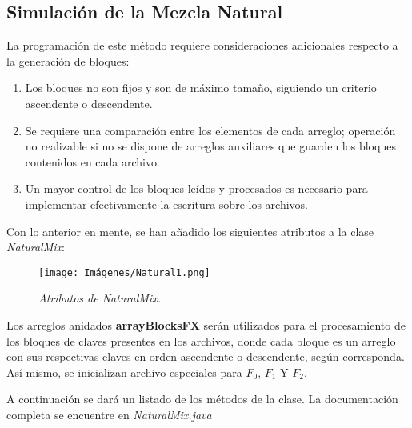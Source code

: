\documentclass[letterpaper,12pt]{extarticle}
\begin{document}
\pagebreak

\subsection{Simulación de la Mezcla Natural}

\noindent La programación de este método requiere consideraciones adicionales respecto a la generación de bloques:

\begin{enumerate}
\item Los bloques no son fijos y son de máximo tamaño, siguiendo un criterio ascendente o descendente.
\item Se requiere una comparación entre los elementos de cada arreglo; operación no realizable si no se dispone
de arreglos auxiliares que guarden los bloques contenidos en cada archivo.
\item Un mayor control de los bloques leídos y procesados es necesario para implementar efectivamente la escritura sobre los archivos.
\end{enumerate}

Con lo anterior en mente, se han añadido los siguientes atributos a la clase \textit{NaturalMix}:

\begin{figure}[h!]
    \centering
    \texttt{[image: Imágenes/Natural1.png]}
    \caption{\textit{Atributos de NaturalMix.}}
    \label{fig:Natural1}
    \end{figure} 
    
Los arreglos anidados \textbf{arrayBlocksFX} serán utilizados para el procesamiento de los bloques de claves presentes en los archivos, donde cada bloque es un arreglo con sus respectivas claves en orden ascendente o descendente, según corresponda. Así mismo, se inicializan archivo especiales para $F_{0}$, $F_{1}$ Y $F_{2}$. 

A continuación se dará un listado de los métodos de la clase. La documentación completa se encuentre en \textit{NaturalMix.java}
\end{document}

